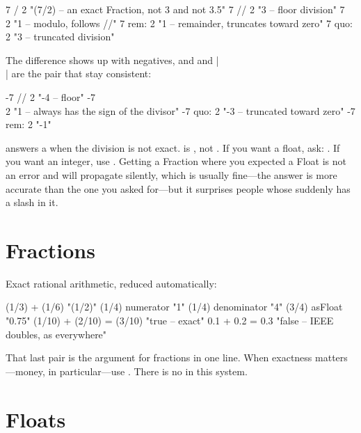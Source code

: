 \begin{st}
7 / 2            "(7/2)   -- an exact Fraction, not 3 and not 3.5"
7 // 2           "3       -- floor division"
7 \\ 2           "1       -- modulo, follows //"
7 rem: 2         "1       -- remainder, truncates toward zero"
7 quo: 2         "3       -- truncated division"
\end{st}

The difference shows up with negatives, and \ct{//} and \ct|\\| are the pair
that stay consistent:

\begin{st}
-7 // 2          "-4      -- floor"
-7 \\ 2          "1       -- always has the sign of the divisor"
-7 quo: 2        "-3      -- truncated toward zero"
-7 rem: 2        "-1"
\end{st}

\begin{stwarn}
\ct{/} answers a  when the division is not exact.  is
, not . If you want a float, ask: . If
you want an integer, use \ct{//}. Getting a Fraction where you expected a
Float is not an error and will propagate silently, which is usually fine---the
answer is more accurate than the one you asked for---but it surprises people
whose  suddenly has a slash in it.
\end{stwarn}

\section{Fractions}

Exact rational arithmetic, reduced automatically:

\begin{st}
(1/3) + (1/6)               "(1/2)"
(1/4) numerator             "1"
(1/4) denominator           "4"
(3/4) asFloat               "0.75"
(1/10) + (2/10) = (3/10)    "true  -- exact"
0.1 + 0.2 = 0.3             "false -- IEEE doubles, as everywhere"
\end{st}

That last pair is the argument for fractions in one line. When exactness
matters---money, in particular---use . There is no
 in this system.

\section{Floats}

